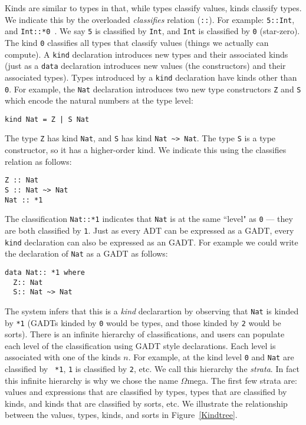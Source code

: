 \documentclass[11pt,twoside]{article}
\newcommand{\om}{$\Omega$mega}
\begin{document}
Kinds are similar to types in that, while types classify values, kinds classify
types. We indicate this by the overloaded {\em classifies} relation ({\tt ::}). For example:
{\tt 5::Int}, and {\tt Int::*0 }. We say {\tt 5} is classified by {\tt Int}, and {\tt Int}
is classified by {\tt *0} (star-zero). The kind {\tt *0} classifies all
types that classify values (things we actually can compute). A {\tt kind}
declaration introduces new types and their associated kinds (just as a {\tt data}
declaration introduces new values (the constructors) and their associated types).
Types introduced by a {\tt kind} declaration have kinds other than {\tt *0}.
For example, the {\tt Nat} declaration introduces two new
type constructors {\tt Z} and {\tt S} which encode the natural
numbers at the type level:  
\begin{verbatim}
kind Nat = Z | S Nat
\end{verbatim}
The type {\tt Z} has kind {\tt Nat}, and {\tt S} has kind {\tt Nat \verb+~+>
Nat}. The type {\tt S} is a type constructor, so it has a higher-order kind. We
indicate this using the classifies relation as follows:
\begin{verbatim}
Z :: Nat
S :: Nat ~> Nat
Nat :: *1
\end{verbatim}

The classification {\tt Nat::*1} indicates that {\tt Nat} is at the same
``level" as {\tt *0} --- they are both classified by {\tt *1}.
Just as every ADT can be expressed as a GADT, every {\tt kind}
declaration can also be expressed as an GADT. For example we could write
the declaration of {\tt Nat} as a GADT as follows:
\begin{verbatim}
data Nat:: *1 where
  Z:: Nat
  S:: Nat ~> Nat
\end{verbatim}

The system infers that this is a {\em kind} declarartion by observing
that {\tt Nat} is kinded by \verb+*1+ (GADTs kinded by {\tt *0} would
be types, and those kinded by {\tt *2} would be sorts). 
There is
an infinite hierarchy of classifications, and users
can populate each level of the classification using GADT style
declarations. Each level is associated with one of the kinds
{\tt *}$n$. For example, at the kind level {\tt *0} and {\tt Nat} are classified by {\tt
*1}, {\tt *1} is classified by {\tt *2}, etc.  We call this hierarchy
the {\em strata}. In fact this infinite hierarchy is why we chose the
name \om. The first few strata are: values and expressions that are
classified by types, types that are classified by kinds, and kinds that
are classified by sorts, etc. We illustrate
the relationship between the values, types, kinds, and sorts in
Figure~\ref{Kindtree}.
\end{document}
